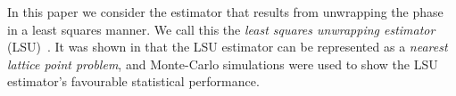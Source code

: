 \documentclass[journal]{IEEEtran}
\begin{document}
In this paper we consider the estimator that results from unwrapping the phase in a least squares manner.  We call this the \emph{least squares unwrapping estimator} (LSU)~\cite{McKilliam2009asilomar_polyest_lattice, McKilliamFrequencyEstimationByPhaseUnwrapping2009}\cite[Chap. 8]{McKilliam2010thesis}.  It was shown in \cite{McKilliam2009asilomar_polyest_lattice, McKilliamFrequencyEstimationByPhaseUnwrapping2009} that the LSU estimator can be represented as a \emph{nearest lattice point problem}, and Monte-Carlo simulations were used to show the LSU estimator's favourable statistical performance. %
\end{document}
